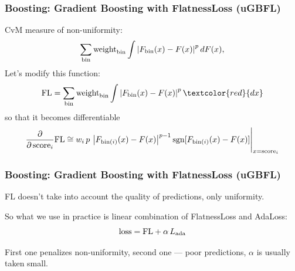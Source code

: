\documentclass{beamer}
\begin{document}
\begin{frame}[t]
    \frametitle{Boosting: Gradient Boosting with FlatnessLoss (uGBFL)}
    CvM measure of non-uniformity:
    \[
        \sum_{\text{bin}} \text{weight}_\text{bin} \int \left\vert F_{\text{bin}}(x) - F(x)\right\vert^p dF(x),
    \]
    Let's modify this function:
    \[
        \FL = \sum_{\bin} \binweight \int \abs{F_{\bin}(x) - F(x)}^p {\textcolor{red}{dx}}
    \]
    so that it becomes differentiable
    \[
        \dfrac{\partial} {\partial \, \text{score}_i} \text{FL}
        \cong 
        w_i \, p \,  \left\vert F_{\text{bin}(i)}(x) - F(x)\right\vert^{p-1}
        \operatorname{sgn}[F_{\text{bin}(i)}(x) - F(x)]
        \Bigg|_{x=\text{score}_i}
    \]
\end{frame}

\begin{frame}
    \frametitle{Boosting: Gradient Boosting with FlatnessLoss (uGBFL)}

    FL doesn't take into account the quality of predictions, only uniformity. 

    So what we use in practice is linear combination of FlatnessLoss and AdaLoss:
    \[
        \text{loss} = \text{FL} + \alpha \, L_\text{ada}
    \]

    First one penalizes non-uniformity, second one --- poor predictions, 
    $\alpha$ is usually taken small.

\end{frame}



\end{document}
